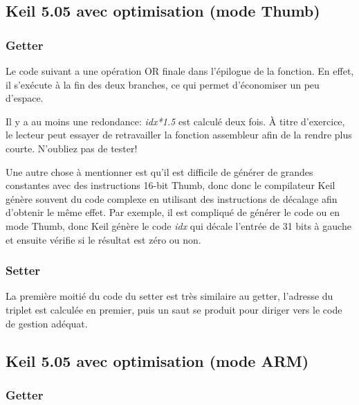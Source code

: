 \subsection{Keil 5.05 avec optimisation (mode Thumb)}

\subsubsection{Getter}

Le code suivant a une opération OR finale dans l'épilogue de la fonction.
En effet, il s'exécute à la fin des deux branches, ce qui permet d'économiser un
peu d'espace.



Il y a au moins une redondance: \emph{idx*1.5} est calculé deux fois.
À titre d'exercice, le lecteur peut essayer de retravailler la fonction assembleur
afin de la rendre plus courte. N'oubliez pas de tester!

Une autre chose à mentionner est qu'il est difficile de générer de grandes constantes
avec des instructions 16-bit Thumb, donc donc le compilateur Keil génère souvent
du code complexe en utilisant des instructions de décalage afin d'obtenir le même
effet.
Par exemple, il est compliqué de générer le code  ou 
en mode Thumb, donc Keil génère le code \emph{idx} qui décale l'entrée de 31 bits à
gauche et ensuite vérifie si le résultat est zéro ou non.

\subsubsection{Setter}

La première moitié du code du setter est très similaire au getter, l'adresse du triplet
est calculée en premier, puis un saut se produit pour diriger vers le code de gestion
adéquat.



\subsection{Keil 5.05 avec optimisation (mode ARM)}

\subsubsection{Getter}

